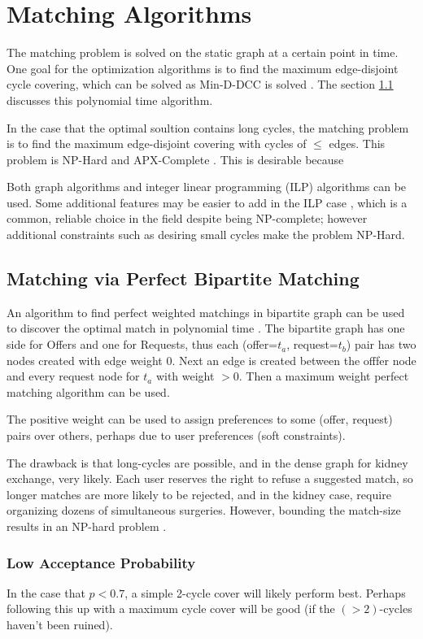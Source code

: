 \documentclass[main.tex]{subfiles}
\begin{document}
\section{Matching Algorithms}
The matching problem is solved on the static graph at a certain point in time. One goal for the optimization algorithms is to find the maximum edge-disjoint cycle covering, which can be solved as Min-D-DCC is solved \cite{Man1} \cite{Bir}. The section \ref{bima} discusses this polynomial time algorithm.

In the case that the optimal soultion contains long cycles, the matching problem is to find the maximum edge-disjoint covering with cycles of $\leq$ edges. This problem is NP-Hard and APX-Complete \cite{Bir}. This is desirable because

Both graph algorithms and integer linear programming (ILP) algorithms can be used. Some additional features may be easier to add in the ILP case , which is a common, reliable choice in the field despite being NP-complete; however additional constraints such as desiring small cycles make the problem NP-Hard.

\subsection{Matching via Perfect Bipartite Matching}\label{bima}

An algorithm to find perfect weighted matchings in bipartite graph can be used to discover the optimal match in polynomial time \cite{Bir}. The bipartite graph has one side for Offers and one for Requests, thus each (offer=$t_a$, request=$t_b$) pair has two nodes created with edge weight $0$. Next an edge is created between the offfer node and every request node for $t_a$ with weight $> 0$. Then a maximum weight perfect matching algorithm can be used.

The positive weight can be used to assign preferences to some (offer, request) pairs over others, perhaps due to user preferences (soft constraints).

The drawback is that long-cycles are possible, and in the dense graph for kidney exchange, very likely. Each user reserves the right to refuse a suggested match, so longer matches are more likely to be rejected, and in the kidney case, require organizing dozens of simultaneous surgeries. However, bounding the match-size results in an NP-hard problem \cite{Bir}.

\subsubsection{Low Acceptance Probability}
In the case that $p < 0.7$, a simple 2-cycle cover will likely perform best. Perhaps following this up with a maximum cycle cover will be good (if the $(>2)$-cycles haven't been ruined).
\end{document}
